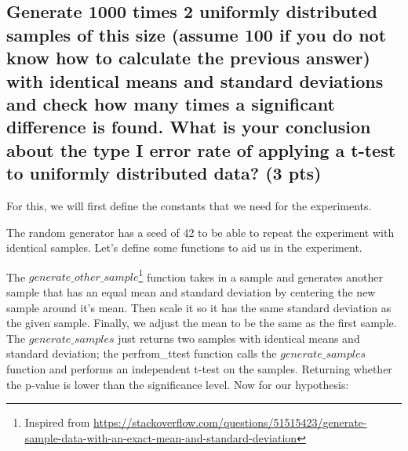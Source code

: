 \documentclass[a4paper]{article}
\begin{document}
\subsection{Generate 1000 times 2 uniformly distributed samples of this size (assume 100 if you do not know how to calculate the previous answer) with identical means and standard deviations and check how many times a significant difference is found. What is your conclusion about the type I error rate of applying a t-test to uniformly distributed data? (3 pts)}
For this, we will first define the constants that we need for the experiments.
The random generator has a seed of 42 to be able to repeat the experiment with identical samples. Let's define some functions to aid us in the experiment.
The $generate\_other\_sample$\footnote{Inspired from \url{https://stackoverflow.com/questions/51515423/generate-sample-data-with-an-exact-mean-and-standard-deviation}} function takes in a sample and generates another sample that has an equal mean and standard deviation by centering the new sample around it's mean. Then scale it so it has the same standard deviation as the given sample. Finally, we adjust the mean to be the same as the first sample. The $generate\_samples$ just returns two samples with identical means and standard deviation; the perfrom\_ttest function calls the $generate\_samples$ function and performs an independent t-test on the samples. Returning whether the p-value is lower than the significance level. Now for our hypothesis: \newline\newline
\end{document}

